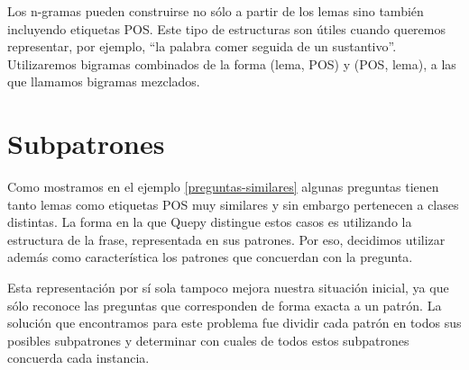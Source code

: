 Los n-gramas pueden construirse no sólo a partir de los lemas sino también incluyendo etiquetas POS. Este tipo de estructuras son útiles cuando queremos representar, por ejemplo, ``la palabra comer seguida de un sustantivo''. Utilizaremos bigramas combinados de la forma (lema, POS) y (POS, lema), a las que llamamos bigramas mezclados.

\section{Subpatrones}

Como mostramos en el ejemplo \ref{preguntas-similares} algunas preguntas tienen tanto lemas como etiquetas POS muy similares y sin embargo pertenecen a clases distintas. La forma en la que Quepy distingue estos casos es utilizando la estructura de la frase, representada en sus patrones. Por eso, decidimos utilizar además como característica los patrones que concuerdan con la pregunta.

Esta representación por sí sola tampoco mejora nuestra situación inicial, ya que sólo reconoce las preguntas que corresponden de forma exacta a un patrón. La solución que encontramos para este problema fue dividir cada patrón en todos sus posibles subpatrones y determinar con cuales de todos estos subpatrones concuerda cada instancia.

